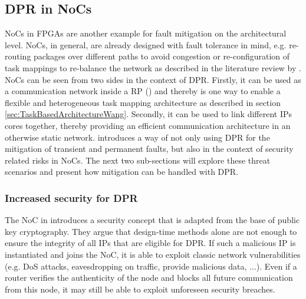 \subsection{\gls{DPR} in \glspl{NoC}}\label{sec:NoC}
\glspl{NoC} in \glspl{FPGA} are another example for fault mitigation on the architectural level. 
\glspl{NoC}, in general, are already designed with fault tolerance in mind, e.g. re-routing packages over different paths to avoid congestion or re-configuration of task mappings to re-balance the network as described in the literature review by \cite{kadri_survey_2019}.
\glspl{NoC} can be seen from two sides in the context of \gls{DPR}. 
Firstly, it can be used as a communication network inside a \gls{RP} (\cite{majer_packet_2005}) and thereby is one way to enable a flexible and heterogeneous task mapping architecture as described in section \ref{sec:TaskBasedArchitectureWang}. 
Secondly, it can be used to link different \glspl{IP} cores together, thereby providing an efficient communication architecture in an otherwise static network.
\cite{wehbe_secure_2016}  introduces a way of not only using \gls{DPR} for the mitigation of transient and permanent faults, but also in the context of security related risks in \glspl{NoC}.
The next two sub-sections will explore these threat scenarios and present how mitigation can be handled with \gls{DPR}. 

\subsubsection{Increased security for \gls{DPR}}\label{sec:IncreasedSecurityNoC}
The \gls{NoC} in \cite{wehbe_secure_2016} introduces a security concept that is adapted from the base of public key cryptography. 
They argue that design-time methods alone are not enough to ensure the integrity of all \glspl{IP} that are eligible for \gls{DPR}.
If such a malicious \gls{IP} is instantiated and joins the \gls{NoC}, it is able to exploit classic network vulnerabilities (e.g. \gls{DoS} attacks, eavesdropping on traffic, provide malicious data, ...).
Even if a router verifies the authenticity of the node and blocks all future communication from this node, it may still be able to exploit unforeseen security breaches.  

